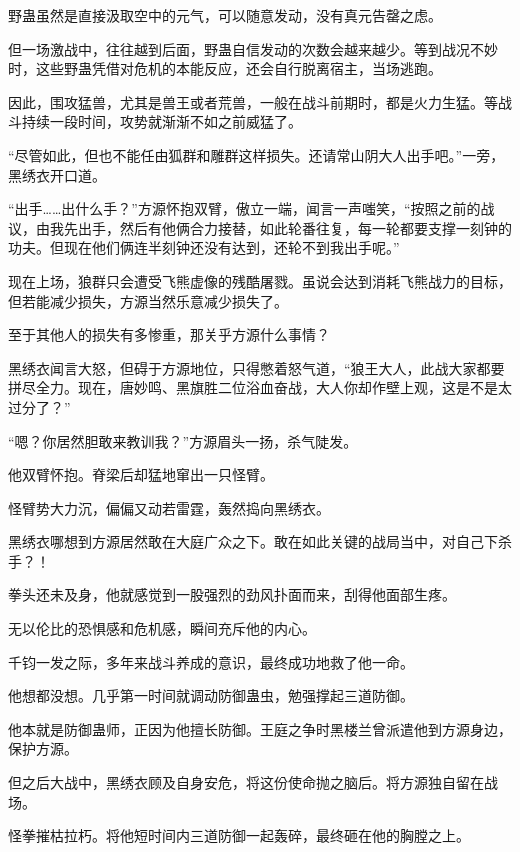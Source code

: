 
\begin{this_body}



野蛊虽然是直接汲取空中的元气，可以随意发动，没有真元告罄之虑。

但一场激战中，往往越到后面，野蛊自信发动的次数会越来越少。等到战况不妙时，这些野蛊凭借对危机的本能反应，还会自行脱离宿主，当场逃跑。

因此，围攻猛兽，尤其是兽王或者荒兽，一般在战斗前期时，都是火力生猛。等战斗持续一段时间，攻势就渐渐不如之前威猛了。

“尽管如此，但也不能任由狐群和雕群这样损失。还请常山阴大人出手吧。”一旁，黑绣衣开口道。

“出手……出什么手？”方源怀抱双臂，傲立一端，闻言一声嗤笑，“按照之前的战议，由我先出手，然后有他俩合力接替，如此轮番往复，每一轮都要支撑一刻钟的功夫。但现在他们俩连半刻钟还没有达到，还轮不到我出手呢。”

现在上场，狼群只会遭受飞熊虚像的残酷屠戮。虽说会达到消耗飞熊战力的目标，但若能减少损失，方源当然乐意减少损失了。

至于其他人的损失有多惨重，那关乎方源什么事情？

黑绣衣闻言大怒，但碍于方源地位，只得憋着怒气道，“狼王大人，此战大家都要拼尽全力。现在，唐妙鸣、黑旗胜二位浴血奋战，大人你却作壁上观，这是不是太过分了？”

“嗯？你居然胆敢来教训我？”方源眉头一扬，杀气陡发。

他双臂怀抱。脊梁后却猛地窜出一只怪臂。

怪臂势大力沉，偏偏又动若雷霆，轰然捣向黑绣衣。

黑绣衣哪想到方源居然敢在大庭广众之下。敢在如此关键的战局当中，对自己下杀手？！

拳头还未及身，他就感觉到一股强烈的劲风扑面而来，刮得他面部生疼。

无以伦比的恐惧感和危机感，瞬间充斥他的内心。

千钧一发之际，多年来战斗养成的意识，最终成功地救了他一命。

他想都没想。几乎第一时间就调动防御蛊虫，勉强撑起三道防御。

他本就是防御蛊师，正因为他擅长防御。王庭之争时黑楼兰曾派遣他到方源身边，保护方源。

但之后大战中，黑绣衣顾及自身安危，将这份使命抛之脑后。将方源独自留在战场。

怪拳摧枯拉朽。将他短时间内三道防御一起轰碎，最终砸在他的胸膛之上。


\end{this_body}
